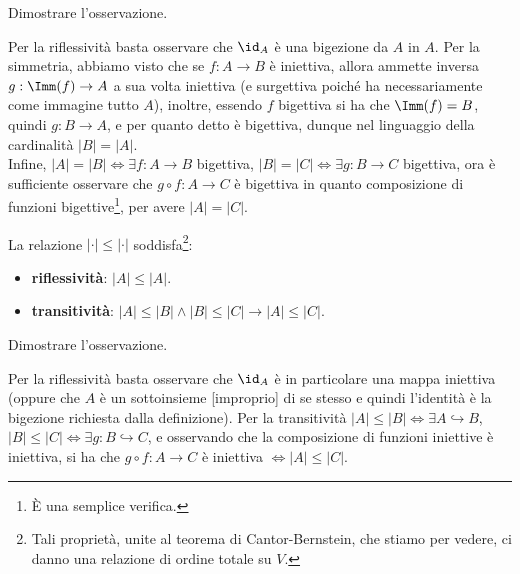 \documentclass[11pt]{scrartcl}
\begin{document}
\begin{exercise}
	Dimostrare l'osservazione.
\end{exercise}

\begin{soln}
Per la riflessività basta osservare che $\id_A$ è una bigezione da $A$ in $A$. Per la simmetria, abbiamo visto che se $f : A \rightarrow B$ è iniettiva, allora ammette
inversa $g : \Imm(f) \rightarrow A$ a sua volta iniettiva (e surgettiva poiché ha necessariamente come immagine tutto $A$), inoltre, essendo $f$ bigettiva si ha che $\Imm(f) = B$, quindi $g : B \rightarrow A$, e 
per quanto detto è bigettiva, dunque nel linguaggio della cardinalità $|B| = |A|$.\\
Infine, $|A| = |B| \iff \exists f : A \rightarrow B$ bigettiva, $|B| = |C| \iff \exists g : B \rightarrow C$ bigettiva, ora è sufficiente osservare che $g \circ f : A \rightarrow C$ è bigettiva in quanto composizione di funzioni bigettive\footnote{È una semplice verifica.}, per avere $|A| = |C|$.
\end{soln}

\begin{remark}
	La relazione $|\cdot| \leq |\cdot|$ soddisfa\footnote{Tali proprietà, unite al teorema di Cantor-Bernstein, che stiamo per vedere, ci danno una relazione di ordine totale su $V$.}:
	\begin{itemize}
		\item \textbf{riflessività}: $|A| \leq |A|$.
		\item \textbf{transitività}: $|A| \leq |B| \land |B| \leq |C| \rightarrow |A| \leq |C|$.
	\end{itemize}
\end{remark}

\begin{exercise}
	Dimostrare l'osservazione.
\end{exercise}

\begin{soln}
Per la riflessività basta osservare che $\id_A$ è in particolare una mappa iniettiva (oppure che $A$ è un sottoinsieme [improprio] di se stesso e quindi l'identità è la bigezione richiesta dalla definizione).
Per la transitività $|A| \leq |B| \iff \exists A \hookrightarrow B$, $|B| \leq |C| \iff \exists g : B \hookrightarrow C$, e osservando che la composizione di funzioni iniettive è iniettiva, si ha che $g \circ f : A \rightarrow C$ è iniettiva $\iff |A| \leq |C|$.
\end{soln}
\end{document}
